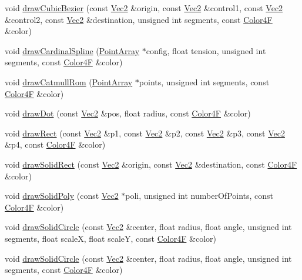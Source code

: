 \begin{DoxyCompactItemize}
\item 
void \hyperlink{classDrawNode_a116fefaf98aab7aed0e75e72c4b44851}{draw\+Cubic\+Bezier} (const \hyperlink{classVec2}{Vec2} \&origin, const \hyperlink{classVec2}{Vec2} \&control1, const \hyperlink{classVec2}{Vec2} \&control2, const \hyperlink{classVec2}{Vec2} \&destination, unsigned int segments, const \hyperlink{structColor4F}{Color4F} \&color)
\item 
void \hyperlink{classDrawNode_a3a049a11a464ef816b4e0883a7995f99}{draw\+Cardinal\+Spline} (\hyperlink{classPointArray}{Point\+Array} $\ast$config, float tension, unsigned int segments, const \hyperlink{structColor4F}{Color4F} \&color)
\item 
void \hyperlink{classDrawNode_a0d495593f7877ce67007bc0fea68147a}{draw\+Catmull\+Rom} (\hyperlink{classPointArray}{Point\+Array} $\ast$points, unsigned int segments, const \hyperlink{structColor4F}{Color4F} \&color)
\item 
void \hyperlink{classDrawNode_af88d6e8ceecb345279adc955df8d1220}{draw\+Dot} (const \hyperlink{classVec2}{Vec2} \&pos, float radius, const \hyperlink{structColor4F}{Color4F} \&color)
\item 
void \hyperlink{classDrawNode_a7bfae00862072e6ebbb4529c2a17246e}{draw\+Rect} (const \hyperlink{classVec2}{Vec2} \&p1, const \hyperlink{classVec2}{Vec2} \&p2, const \hyperlink{classVec2}{Vec2} \&p3, const \hyperlink{classVec2}{Vec2} \&p4, const \hyperlink{structColor4F}{Color4F} \&color)
\item 
void \hyperlink{classDrawNode_a4eed155f58988bab43e8d8bc31bf5ccb}{draw\+Solid\+Rect} (const \hyperlink{classVec2}{Vec2} \&origin, const \hyperlink{classVec2}{Vec2} \&destination, const \hyperlink{structColor4F}{Color4F} \&color)
\item 
void \hyperlink{classDrawNode_a577574914623292940783273d1ea6bff}{draw\+Solid\+Poly} (const \hyperlink{classVec2}{Vec2} $\ast$poli, unsigned int number\+Of\+Points, const \hyperlink{structColor4F}{Color4F} \&color)
\item 
void \hyperlink{classDrawNode_ae875c4cb68b20c87ea3d65c88b09e801}{draw\+Solid\+Circle} (const \hyperlink{classVec2}{Vec2} \&center, float radius, float angle, unsigned int segments, float scaleX, float scaleY, const \hyperlink{structColor4F}{Color4F} \&color)
\item 
void \hyperlink{classDrawNode_afd7235844ce36bc75a1dc950f0ab8a4d}{draw\+Solid\+Circle} (const \hyperlink{classVec2}{Vec2} \&center, float radius, float angle, unsigned int segments, const \hyperlink{structColor4F}{Color4F} \&color)

\end{DoxyCompactItemize}

